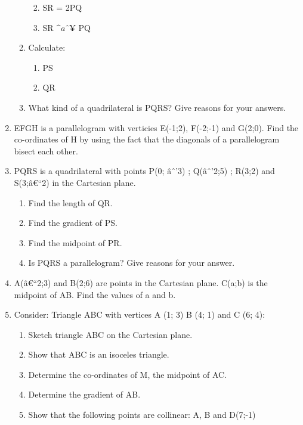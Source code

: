 \begin{enumerate}[noitemsep, label=\textbf{\arabic*}. ]
\begin{enumerate}[noitemsep, label=\textbf{\alph*}. ]
\begin{enumerate}[noitemsep, label=\textbf{\roman*}. ]
            \label{m39167*uid62}\item SR = 2PQ
\label{m39167*uid63}\item SR \begin{math}\^{a}ˆ¥\end{math} PQ
\end{enumerate}
        \label{m39167*uid64}\item Calculate:
\label{m39167*id69993}\begin{enumerate}[noitemsep, label=\textbf{\roman*}. ] 
            \label{m39167*uid65}\item PS
\label{m39167*uid66}\item QR
\end{enumerate}
        \label{m39167*uid67}\item What kind of a quadrilateral is PQRS? Give reasons for your answers.
\end{enumerate}
                \label{m39167*uid68}\item EFGH is a parallelogram with verticies E(-1;2), F(-2;-1) and G(2;0). Find the co-ordinates of H by using the fact that the diagonals of a parallelogram bisect each other.\newline
\item  
PQRS is a quadrilateral with points P(0; \^{a}ˆ'3) ; Q(\^{a}ˆ'2;5) ; R(3;2) and S(3;\^{a}€``2)  in the Cartesian plane.
\label{m39167*id0812312}\begin{enumerate}[noitemsep, label=\textbf{\alph*}. ] 
            \label{m39167*id08123}\item Find the length of QR.\label{m39167*id981221}\item Find the gradient of PS.\label{m39167*id08213}\item Find the midpoint of PR.\label{m39167*id9871293}\item Is PQRS a parallelogram?  Give reasons for your answer. \end{enumerate}
                \item A(\^{a}€``2;3) and B(2;6) are points in the Cartesian plane.  C(a;b) is the midpoint of AB. Find the values of a and b.\newline
\item 
Consider: Triangle ABC with vertices A (1; 3) B (4; 1) and C (6; 4):
\label{m39167*id9173123}\begin{enumerate}[noitemsep, label=\textbf{\alph*}. ] 
            \item Sketch triangle ABC on the Cartesian plane. \item Show that ABC is an isoceles triangle.\item Determine the co-ordinates of M, the midpoint of AC.\item Determine the gradient of AB.\item Show that the following points are collinear: A, B and D(7;-1)\end{enumerate}

\end{enumerate}
